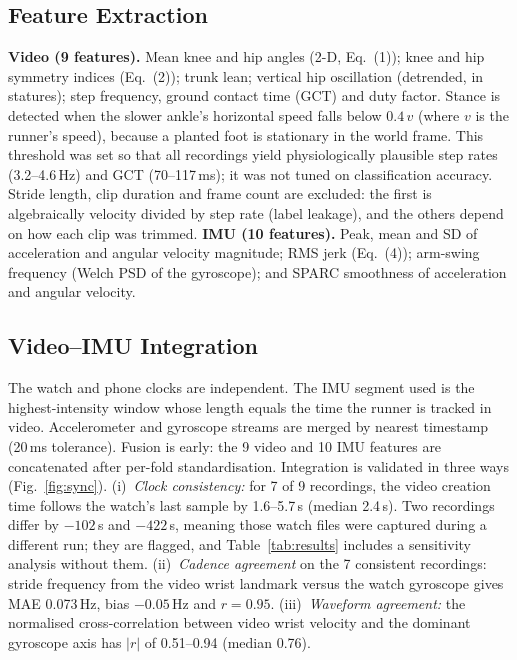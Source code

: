 \subsection{Feature Extraction}
\textbf{Video (9 features).} Mean knee and hip angles (2-D, Eq.~(1)); knee and
hip symmetry indices (Eq.~(2)); trunk lean; vertical hip oscillation
(detrended, in statures); step frequency, ground contact time (GCT) and duty
factor. Stance is detected when the slower ankle's horizontal speed falls below
$0.4\,v$ (where $v$ is the runner's speed), because a planted foot is
stationary in the world frame. This threshold was set so that all recordings
yield physiologically plausible step rates (3.2--4.6\,Hz) and GCT
(70--117\,ms); it was not tuned on classification accuracy. Stride length,
clip duration and frame count are excluded: the first is algebraically
velocity divided by step rate (label leakage), and the others depend on how
each clip was trimmed.
\textbf{IMU (10 features).} Peak, mean and SD of acceleration and angular
velocity magnitude; RMS jerk (Eq.~(4)); arm-swing frequency (Welch PSD of the
gyroscope); and SPARC smoothness of acceleration and angular velocity.

\subsection{Video--IMU Integration}
The watch and phone clocks are independent. The IMU segment used is the
highest-intensity window whose length equals the time the runner is tracked in
video. Accelerometer and gyroscope streams are merged by nearest timestamp
(20\,ms tolerance). Fusion is early: the 9 video and 10 IMU features are
concatenated after per-fold standardisation. Integration is validated in three
ways (Fig.~\ref{fig:sync}).
(i)~\emph{Clock consistency:} for 7 of 9 recordings, the video creation time
follows the watch's last sample by 1.6--5.7\,s (median 2.4\,s). Two recordings
differ by $-102$\,s and $-422$\,s, meaning those watch files were captured
during a different run; they are flagged, and Table~\ref{tab:results} includes
a sensitivity analysis without them.
(ii)~\emph{Cadence agreement} on the 7 consistent recordings: stride frequency
from the video wrist landmark versus the watch gyroscope gives MAE 0.073\,Hz,
bias $-0.05$\,Hz and $r=0.95$.
(iii)~\emph{Waveform agreement:} the normalised cross-correlation between video
wrist velocity and the dominant gyroscope axis has $|r|$ of 0.51--0.94
(median 0.76).

